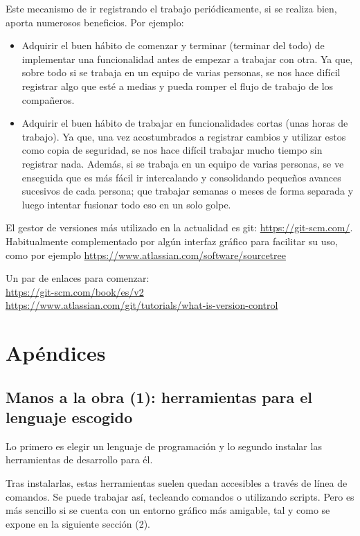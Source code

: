 \documentclass[spanish,12pt,a4paper,final,oneside]{book}
\begin{document}
Este mecanismo de ir registrando el trabajo periódicamente, si se realiza bien, aporta numerosos beneficios. Por ejemplo:
\begin{itemize}
\item Adquirir el buen hábito de comenzar y terminar (terminar del todo) de implementar una funcionalidad antes de empezar a trabajar con otra. Ya que, sobre todo si se trabaja en un equipo de varias personas, se nos hace difícil registrar algo que esté a medias y pueda romper el flujo de trabajo de los compañeros.
\item Adquirir el buen hábito de trabajar en funcionalidades cortas (unas horas de trabajo). Ya que, una vez acostumbrados a registrar cambios y utilizar estos como copia de seguridad, se nos hace difícil trabajar mucho tiempo sin registrar nada. Además, si se trabaja en un equipo de varias personas,  se ve enseguida que es más fácil ir intercalando y consolidando pequeños avances sucesivos de cada persona; que trabajar semanas o meses de forma separada y luego intentar fusionar todo eso en un solo golpe.
\end{itemize}

El gestor de versiones más utilizado en la actualidad es git: \url{https://git-scm.com/}.
\\ Habitualmente complementado por algún interfaz gráfico para facilitar su uso, como por ejemplo {\small \url{https://www.atlassian.com/software/sourcetree}}

Un par de enlaces para comenzar:
\\ \url{https://git-scm.com/book/es/v2}
\\ \url{https://www.atlassian.com/git/tutorials/what-is-version-control}





\chapter{Apéndices}

\section{Manos a la obra (1): herramientas para el lenguaje escogido}\label{manos_a_la_obra_1}


Lo primero es elegir un lenguaje de programación y lo segundo instalar las herramientas de desarrollo para él. 

Tras instalarlas, estas herramientas suelen quedan accesibles a través de línea de comandos. Se puede trabajar así, tecleando comandos o utilizando scripts. Pero es más sencillo si se cuenta con un entorno gráfico más amigable, tal y como se expone en la siguiente sección (2).
\end{document}
